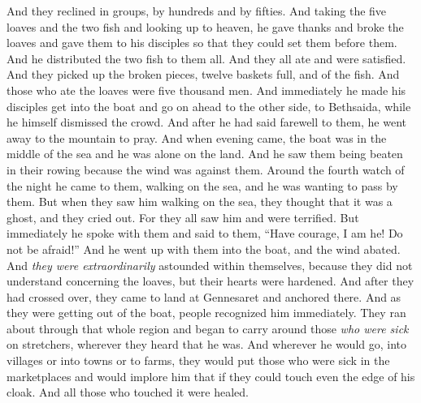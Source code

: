 \begin{biblechapter}
\verse And they reclined in groups, by hundreds and by fifties.
\verse And taking the five loaves and the two fish and looking up to heaven, he gave thanks and broke the loaves and gave them to his disciples so that they could set them before them. And he distributed the two fish to them all.
\verse And they all ate and were satisfied.
\verse And they picked up the broken pieces, twelve baskets full, and of the fish.
\verse And those who ate the loaves were five thousand men.
 And immediately he made his disciples get into the boat and go on ahead to the other side, to Bethsaida, while he himself dismissed the crowd.
\verse And after he had said farewell to them, he went away to the mountain to pray.
\verse And when evening came, the boat was in the middle of the sea and he was alone on the land.
\verse And he saw them being beaten in their rowing because the wind was against them. Around the fourth watch of the night he came to them, walking on the sea, and he was wanting to pass by them.
\verse But when they saw him walking on the sea, they thought that it was a ghost, and they cried out.
\verse For they all saw him and were terrified. But immediately he spoke with them and said to them, “Have courage, I am he! Do not be afraid!”
\verse And he went up with them into the boat, and the wind abated. And \textit{they were extraordinarily} astounded within themselves,
\verse because they did not understand concerning the loaves, but their hearts were hardened.
 And after they had crossed over, they came to land at Gennesaret and anchored there.
\verse And as they were getting out of the boat, people recognized him immediately.
\verse They ran about through that whole region and began to carry around those \textit{who were sick} on stretchers, wherever they heard that he was.
\verse And wherever he would go, into villages or into towns or to farms, they would put those who were sick in the marketplaces and would implore him that if they could touch even the edge of his cloak. And all those who touched it were healed.
\end{biblechapter}

